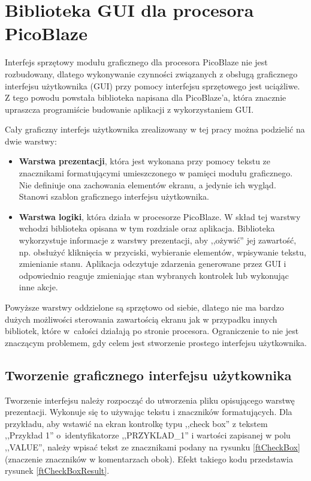
\rozdzial

\section{Biblioteka GUI dla procesora PicoBlaze}
\label{guilib_section}


Interfejs sprzętowy modułu graficznego dla procesora PicoBlaze nie jest rozbudowany, dlatego wykonywanie czynności związanych z obsługą graficznego interfejsu użytkownika (GUI) przy pomocy interfejsu sprzętowego jest uciążliwe. Z tego powodu powstała biblioteka napisana dla PicoBlaze'a, która znacznie upraszcza programiście budowanie aplikacji z wykorzystaniem GUI.


Cały graficzny interfejs użytkownika zrealizowany w tej pracy można podzielić na dwie warstwy:

\begin{itemize}
	\item \textbf{Warstwa prezentacji}, która jest wykonana przy pomocy tekstu ze znacznikami formatującymi umieszczonego w pamięci modułu graficznego. Nie definiuje ona zachowania elementów ekranu, a jedynie ich wygląd. Stanowi szablon graficznego interfejsu użytkownika.
	\item \textbf{Warstwa logiki}, która działa w procesorze PicoBlaze. W skład tej warstwy wchodzi biblioteka opisana w tym rozdziale oraz aplikacja. Biblioteka wykorzystuje informacje z warstwy prezentacji, aby ,,ożywić'' jej zawartość, np. obsłużyć kliknięcia w przyciski, wybieranie elementów, wpisywanie tekstu, zmienianie stanu. Aplikacja odczytuje zdarzenia generowane przez GUI i odpowiednio reaguje zmieniając stan wybranych kontrolek lub wykonując inne akcje.
\end{itemize}

Powyższe warstwy oddzielone są sprzętowo od siebie, dlatego nie ma bardzo dużych możliwości sterowania zawartością ekranu jak w przypadku innych bibliotek, które w~całości działają po stronie procesora. Ograniczenie to nie jest znaczącym problemem, gdy celem jest stworzenie prostego interfejsu użytkownika.


\subsection{Tworzenie graficznego interfejsu użytkownika}
\label{Tworzenie_graficznego_interfejsu_uzytkownika}

Tworzenie interfejsu należy rozpocząć do utworzenia pliku opisującego warstwę prezentacji. Wykonuje się to używając tekstu i znaczników formatujących. Dla przykładu, aby wstawić na ekran kontrolkę typu ,,check box'' z tekstem ,,Przykład 1'' o~identyfikatorze ,,PRZYKLAD\_1'' i wartości zapisanej w polu ,,VALUE'', należy wpisać tekst ze znacznikami podany na rysunku \ref{ftCheckBox} (znaczenie znaczników w komentarzach obok). Efekt takiego kodu przedstawia rysunek \ref{ftCheckBoxResult}.

